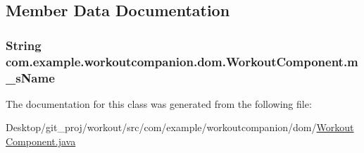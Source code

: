 \subsection{Member Data Documentation}
\hypertarget{classcom_1_1example_1_1workoutcompanion_1_1dom_1_1_workout_component_aea36d36e652e5d7501135663a7a1148f}{
\subsubsection[{m\-\_\-s\-Name}]{\setlength{\rightskip}{0pt plus 5cm}String com.\-example.\-workoutcompanion.\-dom.\-Workout\-Component.\-m\-\_\-s\-Name\hspace{0.3cm}{\ttfamily [protected]}}}\label{classcom_1_1example_1_1workoutcompanion_1_1dom_1_1_workout_component_aea36d36e652e5d7501135663a7a1148f}


The documentation for this class was generated from the following file\-:\begin{DoxyCompactItemize}
\item 
Desktop/git\-\_\-proj/workout/src/com/example/workoutcompanion/dom/\hyperlink{_workout_component_8java}{Workout\-Component.\-java}\end{DoxyCompactItemize}
